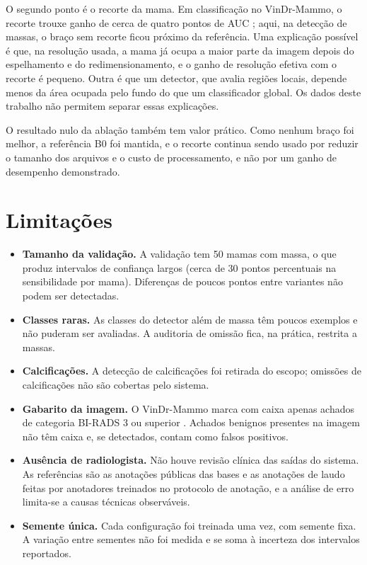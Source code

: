 O segundo ponto é o recorte da mama. Em classificação no VinDr-Mammo, o recorte trouxe ganho de cerca de quatro pontos de AUC \cite{ibragimov2024mamt4}; aqui, na detecção de massas, o braço sem recorte ficou próximo da referência. Uma explicação possível é que, na resolução usada, a mama já ocupa a maior parte da imagem depois do espelhamento e do redimensionamento, e o ganho de resolução efetiva com o recorte é pequeno. Outra é que um detector, que avalia regiões locais, depende menos da área ocupada pelo fundo do que um classificador global. Os dados deste trabalho não permitem separar essas explicações.

O resultado nulo da ablação também tem valor prático. Como nenhum braço foi melhor, a referência B0 foi mantida, e o recorte continua sendo usado por reduzir o tamanho dos arquivos e o custo de processamento, e não por um ganho de desempenho demonstrado.

\section{Limitações}

\begin{itemize}
  \item \textbf{Tamanho da validação.} A validação tem 50 mamas com massa, o que produz intervalos de confiança largos (cerca de 30 pontos percentuais na sensibilidade por mama). Diferenças de poucos pontos entre variantes não podem ser detectadas.
  \item \textbf{Classes raras.} As classes do detector além de massa têm poucos exemplos e não puderam ser avaliadas. A auditoria de omissão fica, na prática, restrita a massas.
  \item \textbf{Calcificações.} A detecção de calcificações foi retirada do escopo; omissões de calcificações não são cobertas pelo sistema.
  \item \textbf{Gabarito da imagem.} O VinDr-Mammo marca com caixa apenas achados de categoria BI-RADS 3 ou superior \cite{nguyen2023vindr}. Achados benignos presentes na imagem não têm caixa e, se detectados, contam como falsos positivos.
  \item \textbf{Ausência de radiologista.} Não houve revisão clínica das saídas do sistema. As referências são as anotações públicas das bases e as anotações de laudo feitas por anotadores treinados no protocolo de anotação, e a análise de erro limita-se a causas técnicas observáveis.
  \item \textbf{Semente única.} Cada configuração foi treinada uma vez, com semente fixa. A variação entre sementes não foi medida e se soma à incerteza dos intervalos reportados.
\end{itemize}

